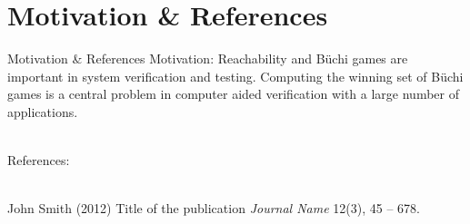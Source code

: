 
\section{Motivation \& References}
\begin{frame}{Motivation \& References}
    Motivation: Reachability and Büchi games are important in system verification and testing. Computing the winning set of Büchi games is a central problem in computer aided verification with a large number of applications.\\~
    
    References: \\~
    \footnotesize{
        \begin{thebibliography}{99}
             John Smith (2012)
            \newblock Title of the publication
            \newblock \emph{Journal Name} 12(3), 45 -- 678.
        \end{thebibliography}
    }
\end{frame}
